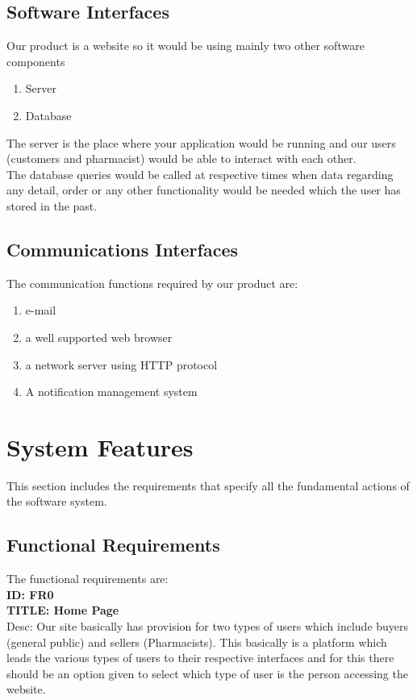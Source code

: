 \documentclass{scrreprt}
\begin{document}
\section{Software Interfaces}
Our product is a website so it would be using mainly two other software components 
\begin{enumerate}
\item Server
\item Database
\end{enumerate}
The server is the place where your application would be running and our users (customers and pharmacist) would be able to interact with each other.  \\
The database queries would be called at respective times when data regarding any detail, order or any other functionality would be needed which the user has stored in the past.

\section{Communications Interfaces}
The communication functions required by our product are:
\begin{enumerate}
\item e-mail 
\item a well supported web browser
\item a network server using HTTP protocol
\item A notification management system
\end{enumerate}

\chapter{System Features}
This section includes the requirements that specify all the fundamental actions of the software system.

\section{Functional Requirements}
The functional requirements are:\\

 \textbf{ID: FR0}\\
 \textbf{TITLE: Home Page}\\
Desc: Our site basically has provision for two types of users which include buyers (general public) and sellers (Pharmacists). This basically is a platform which leads the various types of users to their respective interfaces and for this there should be an option given to select which type of user is the person accessing the website.\\
\end{document}
